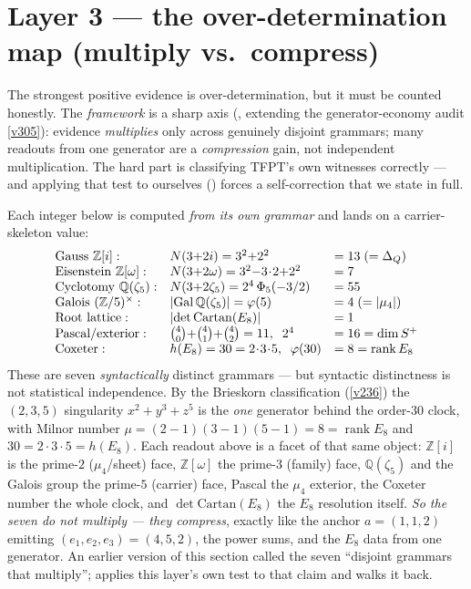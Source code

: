 \documentclass[11pt,a4paper]{article}
\newcommand{\Z}{\mathbb Z}
\begin{document}
\section{Layer 3 --- the over-determination map (multiply vs.\ compress)}
The strongest positive evidence is over-determination, but it must be counted honestly. The
\emph{framework} is a sharp axis (, extending the generator-economy
audit \vref{v305}): evidence \emph{multiplies} only across genuinely disjoint grammars; many readouts
from one generator are a \emph{compression} gain, not independent multiplication. The hard part is
classifying TFPT's own witnesses correctly --- and applying that test to ourselves
() forces a self-correction that we state in full.
\begin{keybox}
Each integer below is computed \emph{from its own grammar} and lands on a carrier-skeleton value:
\[
\begin{array}{lll}
\text{Gauss } \Z[i]: & N(3{+}2i)=3^2{+}2^2 & = 13\;(=\Delta_Q)\\
\text{Eisenstein } \Z[\omega]: & N(3{+}2\omega)=3^2{-}3\!\cdot\!2{+}2^2 & = 7\\
\text{Cyclotomy } \mathbb Q(\zeta_5): & N(3{+}2\zeta_5)=2^4\,\Phi_5(-3/2) & = 55\\
\text{Galois } (\Z/5)^\times: & |\!\operatorname{Gal}\mathbb Q(\zeta_5)|=\varphi(5) & = 4\;(=|\mu_4|)\\
\text{Root lattice}: & |\!\det\mathrm{Cartan}(E_8)| & = 1\\
\text{Pascal/exterior}: & \tbinom40{+}\tbinom41{+}\tbinom42 = 11,\;\; 2^4 & = 16=\dim S^+\\
\text{Coxeter}: & h(E_8)=30=2\!\cdot\!3\!\cdot\!5,\;\; \varphi(30) & = 8=\operatorname{rank}E_8
\end{array}
\]
These are seven \emph{syntactically} distinct grammars --- but syntactic distinctness is not statistical
independence. By the Brieskorn classification (\vref{v236}) the $(2,3,5)$ singularity $x^2{+}y^3{+}z^5$ is
the \emph{one} generator behind the order-$30$ clock, with Milnor number $\mu=(2{-}1)(3{-}1)(5{-}1)=8=
\operatorname{rank}E_8$ and $30=2\!\cdot\!3\!\cdot\!5=h(E_8)$. Each readout above is a facet of that same
object: $\Z[i]$ is the prime-$2$ ($\mu_4$/sheet) face, $\Z[\omega]$ the prime-$3$ (family) face,
$\mathbb Q(\zeta_5)$ and the Galois group the prime-$5$ (carrier) face, Pascal the $\mu_4$ exterior, the
Coxeter number the whole clock, and $\det\mathrm{Cartan}(E_8)$ the $E_8$ resolution itself. \emph{So the
seven do not multiply --- they compress}, exactly like the anchor $a=(1,1,2)$ emitting
$(e_1,e_2,e_3)=(4,5,2)$, the power sums, and the $E_8$ data from one generator. An earlier version of this
section called the seven ``disjoint grammars that multiply'';  applies
this layer's own test to that claim and walks it back.
\end{keybox}
\end{document}
